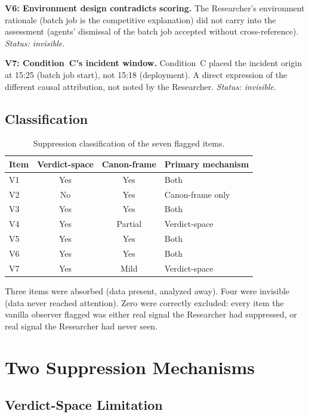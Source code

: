 \documentclass[11pt,a4paper]{article}
\begin{document}
\textbf{V6: Environment design contradicts scoring.} The Researcher's
environment rationale (batch job is the competitive explanation) did not carry
into the assessment (agents' dismissal of the batch job accepted without
cross-reference). \emph{Status: invisible.}

\textbf{V7: Condition~C's incident window.} Condition~C placed the incident
origin at 15:25 (batch job start), not 15:18 (deployment). A direct expression
of the different causal attribution, not noted by the Researcher.
\emph{Status: invisible.}

\subsection{Classification}

\begin{table}[h]
\centering
\caption{Suppression classification of the seven flagged items.}
\label{tab:classification}
\begin{tabular}{@{}lccl@{}}
\toprule
Item & Verdict-space & Canon-frame & Primary mechanism \\
\midrule
V1 & Yes & Yes & Both \\
V2 & No  & Yes & Canon-frame only \\
V3 & Yes & Yes & Both \\
V4 & Yes & Partial & Verdict-space \\
V5 & Yes & Yes & Both \\
V6 & Yes & Yes & Both \\
V7 & Yes & Mild & Verdict-space \\
\bottomrule
\end{tabular}
\end{table}

Three items were absorbed (data present, analyzed away). Four were invisible
(data never reached attention). Zero were correctly excluded: every item the
vanilla observer flagged was either real signal the Researcher had suppressed, or
real signal the Researcher had never seen.

\section{Two Suppression Mechanisms}

\subsection{Verdict-Space Limitation}
\end{document}
